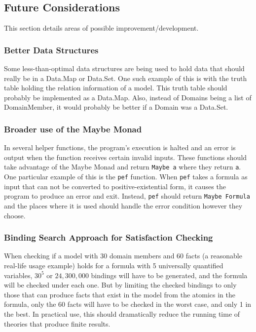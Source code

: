 	\subsection{Future Considerations}

		This section details areas of possible improvement/development.

		\subsubsection{Better Data Structures}

			Some less-than-optimal data structures are being used to hold data
			that should really be in a Data.Map or Data.Set. One such example
			of this is with the truth table holding the relation information of
			a model. This truth table should probably be implemented as a
			Data.Map. Also, instead of Domains being a list of DomainMember, it
			would probably be better if a Domain was a Data.Set.

		\subsubsection{Broader use of the Maybe Monad}

			In several helper functions, the program's execution is halted and
			an error is output when the function receives certain invalid
			inputs. These functions should take advantage of the Maybe Monad
			and return {\tt Maybe a} where they return {\tt a}. One particular
			example of this is the {\tt pef} function. When {\tt pef} takes a
			formula as input that can not be converted to positive-existential
			form, it causes the program to produce an error and exit. Instead,
			{\tt pef} should return {\tt Maybe Formula} and the places where it
			is used should handle the error condition however they choose.

		\subsubsection{Binding Search Approach for Satisfaction Checking}

			When checking if a model with 30 domain members and 60 facts (a
			reasonable real-life usage example) holds for a formula with 5
			universally quantified variables, $30^5$ or $24,300,000$ bindings
			will have to be generated, and the formula will be checked under
			each one. But by limiting the checked bindings to only those that
			can produce facts that exist in the model from the atomics in the
			formula, only the 60 facts will have to be checked in the worst
			case, and only 1 in the best. In practical use, this should
			dramatically reduce the running time of theories that produce
			finite results.

